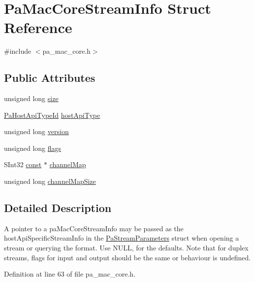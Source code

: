 \hypertarget{struct_pa_mac_core_stream_info}{}\section{Pa\+Mac\+Core\+Stream\+Info Struct Reference}
\label{struct_pa_mac_core_stream_info}


{\ttfamily \#include $<$pa\+\_\+mac\+\_\+core.\+h$>$}

\subsection*{Public Attributes}
\begin{DoxyCompactItemize}
\item 
unsigned long \hyperlink{struct_pa_mac_core_stream_info_a6a208a662332f447094b382a00a2a635}{size}
\item 
\hyperlink{portaudio_8h_a8eaebe3d39c5ea45598da8f86dc2e5ae}{Pa\+Host\+Api\+Type\+Id} \hyperlink{struct_pa_mac_core_stream_info_a63f4110b767bfbf2fa09b88f3252d91e}{host\+Api\+Type}
\item 
unsigned long \hyperlink{struct_pa_mac_core_stream_info_ad5ef9592026b8e98f2bf17a61677b064}{version}
\item 
unsigned long \hyperlink{struct_pa_mac_core_stream_info_afe018712e7c57198176ed72cb18f9938}{flags}
\item 
S\+Int32 \hyperlink{getopt1_8c_a2c212835823e3c54a8ab6d95c652660e}{const} $\ast$ \hyperlink{struct_pa_mac_core_stream_info_a2339c27ad6b84924be79bf73e4402bd4}{channel\+Map}
\item 
unsigned long \hyperlink{struct_pa_mac_core_stream_info_aab3ecc35ef267ecebc8874d399061b87}{channel\+Map\+Size}
\end{DoxyCompactItemize}


\subsection{Detailed Description}
A pointer to a pa\+Mac\+Core\+Stream\+Info may be passed as the host\+Api\+Specific\+Stream\+Info in the \hyperlink{struct_pa_stream_parameters}{Pa\+Stream\+Parameters} struct when opening a stream or querying the format. Use N\+U\+LL, for the defaults. Note that for duplex streams, flags for input and output should be the same or behaviour is undefined. 

Definition at line 63 of file pa\+\_\+mac\+\_\+core.\+h.



